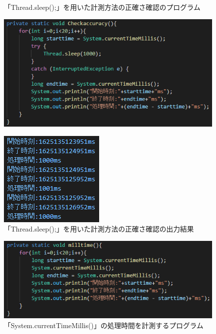 \begin{itemize}
  \begin{figure}[htbp]
    \begin{minipage}[t]{0.5\hsize}
      \centering
      \caption{「Thread.sleep();」を用いた計測方法の正確さ確認のプログラム}
      \label{graph:5}
      \includegraphics[scale=0.75]{計測方法の正確さを確認.PNG}
    \end{minipage}
    \begin{minipage}[t]{0.45\hsize}
      \centering
      \caption{「Thread.sleep();」を用いた計測方法の正確さ確認の出力結果}
      \label{graph:6}
      \includegraphics[scale=0.9]{計測方法の正確さを確認の出力.PNG}
    \end{minipage}
  \end{figure}
  \begin{figure}[htbp]
    \begin{minipage}[t]{0.5\hsize}
      \centering
      \caption{「System.currentTimeMillis()」の処理時間を計測するプログラム}
      \label{graph:3}
      \includegraphics[scale=0.75]{milltimeのプログラム.PNG}

\end{minipage}
\end{figure}
\end{itemize}

